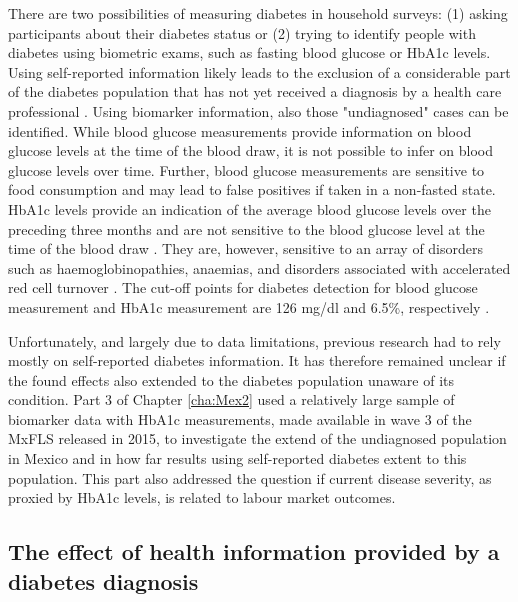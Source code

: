 There are two possibilities of measuring diabetes in household surveys: (1) asking participants about their diabetes status or (2) trying to identify people with diabetes using biometric exams, such as fasting blood glucose or \ac{HbA1c} levels. Using self-reported information likely leads to the exclusion of a considerable part of the diabetes population that has not yet received a diagnosis by a health care professional \parencite{Beagley2014}. Using biomarker information, also those "undiagnosed" cases can be identified. While blood glucose measurements provide information on blood glucose levels at the time of the blood draw, it is not possible to infer on blood glucose levels over time. Further, blood glucose measurements are sensitive to food consumption and may lead to false positives if taken in a non-fasted state. \ac{HbA1c} levels provide an indication of the average blood glucose levels over the preceding three months and are not sensitive to the blood glucose level at the time of the blood draw \parencite{WorldHealthOrganization2011}. They are, however, sensitive to an array of disorders such as haemoglobinopathies, anaemias, and disorders associated with accelerated red cell turnover \parencite{WorldHealthOrganization2011}. The cut-off points for diabetes detection for blood glucose measurement and \ac{HbA1c} measurement are 126 mg/dl and 6.5\%, respectively \parencite{WorldHealthOrganization2006,WorldHealthOrganization2011}.

Unfortunately, and largely due to data limitations, previous research had to rely mostly on self-reported diabetes information. It has therefore remained unclear if the found effects also extended to the diabetes population unaware of its condition. Part 3 of Chapter \ref{cha:Mex2} used a relatively large sample of biomarker data with \ac{HbA1c} measurements, made available in wave 3 of the \ac{MxFLS} released in 2015, to investigate the extend of the undiagnosed population in Mexico and in how far results using self-reported diabetes extent to this population. This part also addressed the question if current disease severity, as proxied by \ac{HbA1c} levels, is related to labour market outcomes.

\subsection{The effect of health information provided by a diabetes diagnosis}

